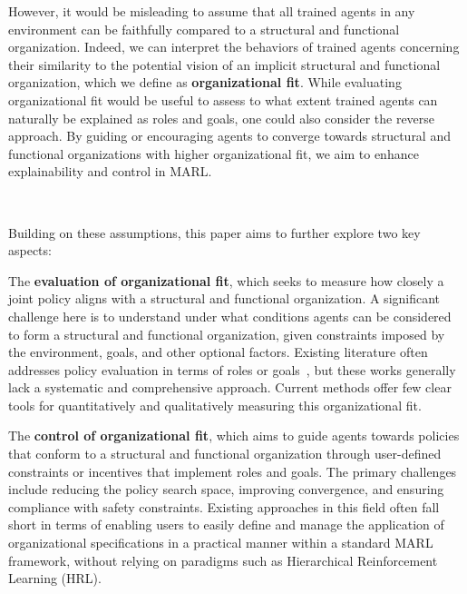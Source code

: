 \documentclass[sigconf]{aamas}
\begin{document}
However, it would be misleading to assume that all trained agents in any environment can be faithfully compared to a structural and functional organization. Indeed, we can interpret the behaviors of trained agents concerning their similarity to the potential vision of an implicit structural and functional organization, which we define as \textbf{organizational fit}.
While evaluating organizational fit would be useful to assess to what extent trained agents can naturally be explained as roles and goals, one could also consider the reverse approach. By guiding or encouraging agents to converge towards structural and functional organizations with higher organizational fit, we aim to enhance explainability and control in MARL.

\

Building on these assumptions, this paper aims to further explore two key aspects:
\begin{enumerate*}[label={\roman*) },itemjoin={; \quad}]
  \item The \textbf{evaluation of organizational fit}, which seeks to measure how closely a joint policy aligns with a structural and functional organization. A significant challenge here is to understand under what conditions agents can be considered to form a structural and functional organization, given constraints imposed by the environment, goals, and other optional factors.
        Existing literature often addresses policy evaluation in terms of roles or goals~\cite{Isakov2024, Wen2024, Xie2024}, but these works generally lack a systematic and comprehensive approach. Current methods offer few clear tools for quantitatively and qualitatively measuring this organizational fit.
  \item The \textbf{control of organizational fit}, which aims to guide agents towards policies that conform to a structural and functional organization through user-defined constraints or incentives that implement roles and goals.
        The primary challenges include reducing the policy search space, improving convergence, and ensuring compliance with safety constraints.
        Existing approaches in this field often fall short in terms of enabling users to easily define and manage the application of organizational specifications in a practical manner within a standard MARL framework, without relying on paradigms such as Hierarchical Reinforcement Learning (HRL).
\end{enumerate*}

\
\end{document}
